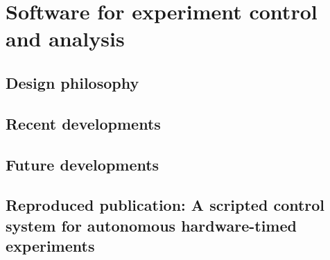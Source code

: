 \chapter{Software for experiment control and analysis}\label{chap:software}
\section{Design philosophy}
\null\newpage\null\newpage\null\newpage
\section{Recent developments}
\null\newpage\null\newpage\null\newpage
\section{Future developments}
\null\newpage\null\newpage\null\newpage
\section{Reproduced publication: A scripted control system for autonomous hardware-timed experiments}

